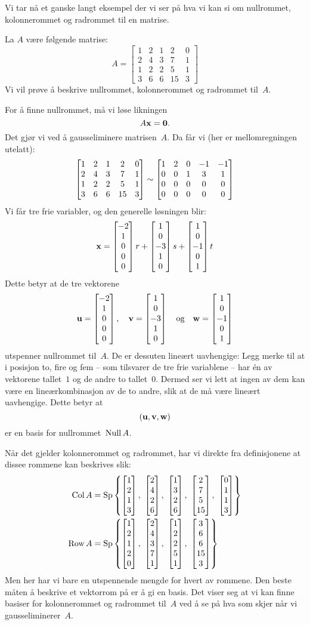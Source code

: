 Vi tar nå et ganske langt eksempel der vi ser på hva vi kan si om
nullrommet, kolonnerommet og rad\-rommet til en matrise.

\begin{ex}
La $A$ være følgende matrise:
\[
A =
\begin{bmatrix}
1 & 2 & 1 &  2 & 0 \\
2 & 4 & 3 &  7 & 1 \\
1 & 2 & 2 &  5 & 1 \\
3 & 6 & 6 & 15 & 3
\end{bmatrix}
\]
Vi vil prøve å beskrive nullrommet, kolonnerommet og radrommet
til~$A$.

For å finne nullrommet, må vi løse likningen
\[
A \mathbf{x} = \mathbf{0}.
\]
Det gjør vi ved å gausseliminere matrisen~$A$.  Da får vi (her er
mellomregningen utelatt):
\[
\begin{bmatrix}
1 & 2 & 1 &  2 & 0 \\
2 & 4 & 3 &  7 & 1 \\
1 & 2 & 2 &  5 & 1 \\
3 & 6 & 6 & 15 & 3
\end{bmatrix}
\sim
\begin{bmatrix}
1 & 2 & 0 & -1 & -1 \\
0 & 0 & 1 &  3 & 1 \\
0 & 0 & 0 &  0 & 0 \\
0 & 0 & 0 &  0 & 0
\end{bmatrix}
\]
Vi får tre frie variabler, og den generelle løsningen blir:
\[
\mathbf{x} = \begin{bmatrix} -2 \\ 1 \\ 0 \\ 0 \\ 0 \end{bmatrix} r +
     \begin{bmatrix} 1 \\ 0 \\ -3 \\ 1 \\ 0 \end{bmatrix} s +
     \begin{bmatrix} 1 \\ 0 \\ -1 \\ 0 \\ 1 \end{bmatrix} t
\]
Dette betyr at de tre vektorene
\[
\mathbf{u} = \begin{bmatrix} -2 \\ 1 \\ 0 \\ 0 \\ 0 \end{bmatrix},\quad
\mathbf{v} = \begin{bmatrix} 1 \\ 0 \\ -3 \\ 1 \\ 0 \end{bmatrix}\quad
\text{og}\quad
\mathbf{w} = \begin{bmatrix} 1 \\ 0 \\ -1 \\ 0 \\ 1 \end{bmatrix}
\]
utspenner nullrommet til~$A$.  De er dessuten lineært uavhengige: Legg
merke til at i posisjon to, fire og fem -- som tilsvarer de tre frie
variablene -- har én av vektorene tallet~$1$ og de andre to
tallet~$0$.  Dermed ser vi lett at ingen av dem kan være en
lineærkombinasjon av de to andre, slik at de må være lineært
uavhengige.  Dette betyr at
\[
(\mathbf{u}, \mathbf{v}, \mathbf{w})
\]
er en basis for nullrommet~$\operatorname{Null} A$.

Når det gjelder kolonnerommet og radrommet, har vi direkte fra
definisjonene at dissee rommene kan beskrives slik:
\begin{align*}
\Col A &=
\Sp \left\{
\vvvv{1}{2}{1}{3},\ %
\vvvv{2}{4}{2}{6},\ %
\vvvv{1}{3}{2}{6},\ %
\vvvv{2}{7}{5}{15},\ %
\vvvv{0}{1}{1}{3}
\right\}
\\
\Row A &=
\Sp \left\{
\vvvvv{1}{2}{1}{ 2}{0},\ %
\vvvvv{2}{4}{3}{ 7}{1},\ %
\vvvvv{1}{2}{2}{ 5}{1},\ %
\vvvvv{3}{6}{6}{15}{3}
\right\}
\end{align*}
Men her har vi bare en utspennende mengde for hvert av rommene.  Den
beste måten å beskrive et vektorrom på er å gi en basis.  Det viser
seg at vi kan finne basiser for kolonnerommet og radrommet til~$A$ ved
å se på hva som skjer når vi gausseliminerer~$A$.


\end{ex}
